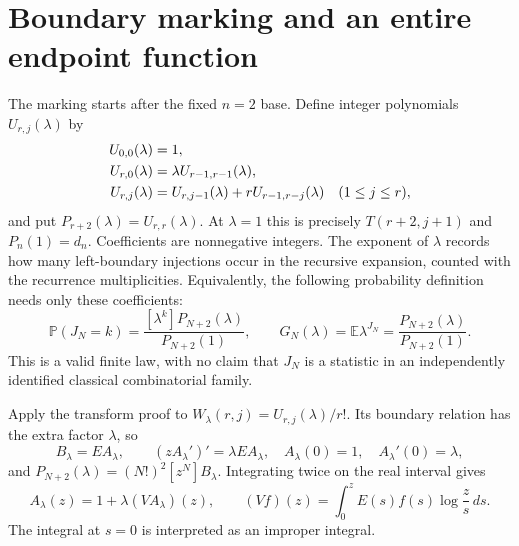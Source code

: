 \documentclass[11pt,letterpaper]{article}
\theoremstyle{remark}\newtheorem{remark}[theorem]{Remark}
\newcommand{\E}{\mathbb E}\newcommand{\PP}{\mathbb P}
\begin{document}
\section{Boundary marking and an entire endpoint function}\label{men:sec:mark}
The marking starts after the fixed $n=2$ base. Define integer polynomials $U_{r,j}(\lambda)$ by
\begin{align}
 U_{0,0}(\lambda)&=1,\notag\\
 U_{r,0}(\lambda)&=\lambda U_{r-1,r-1}(\lambda),\label{men:eq:markedarray}\\
 U_{r,j}(\lambda)&=U_{r,j-1}(\lambda)+rU_{r-1,r-j}(\lambda)
       \quad(1\le j\le r),\notag
\end{align}
and put $P_{r+2}(\lambda)=U_{r,r}(\lambda)$. At $\lambda=1$ this is precisely $T(r+2,j+1)$ and $P_n(1)=d_n$. Coefficients are nonnegative integers. The exponent of $\lambda$ records how many left-boundary injections occur in the recursive expansion, counted with the recurrence multiplicities. Equivalently, the following probability definition needs only these coefficients:
\begin{equation}\label{men:eq:finitepgf}
 \PP(J_N=k)=\frac{[\lambda^k]P_{N+2}(\lambda)}{P_{N+2}(1)},\qquad
 G_N(\lambda)=\E\lambda^{J_N}=\frac{P_{N+2}(\lambda)}{P_{N+2}(1)}.
\end{equation}
This is a valid finite law, with no claim that $J_N$ is a statistic in an independently identified classical combinatorial family.

Apply the transform proof to $W_\lambda(r,j)=U_{r,j}(\lambda)/r!$. Its boundary relation has the extra factor $\lambda$, so
\begin{equation}\label{men:eq:markedode}
 B_\lambda=EA_\lambda,\qquad (zA_\lambda')'=\lambda EA_\lambda,
 \quad A_\lambda(0)=1,\quad A_\lambda'(0)=\lambda,
\end{equation}
and $P_{N+2}(\lambda)=(N!)^2[z^N]B_\lambda$. Integrating twice on the real interval gives
\begin{equation}\label{men:eq:volterra}
 A_\lambda(z)=1+\lambda(VA_\lambda)(z),\qquad
 (Vf)(z)=\int_0^z E(s)f(s)\log\frac zs\,ds.
\end{equation}
The integral at $s=0$ is interpreted as an improper integral.
\end{document}
